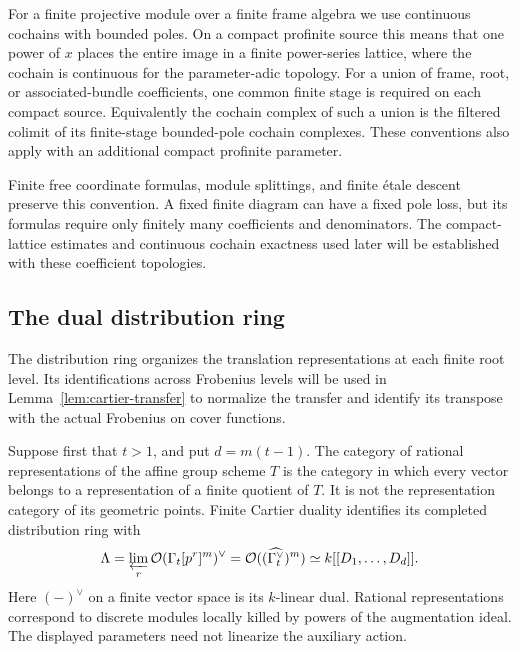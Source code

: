 \begin{definition}
\label{rings:bounded-cochains}
For a finite projective module over a finite frame algebra
we use continuous cochains with bounded poles.  On a compact
profinite source this means that one power of $x$ places the
entire image in a finite power-series lattice, where the
cochain is continuous for the parameter-adic topology.
For a union of frame, root, or associated-bundle coefficients,
one common finite stage is required on each compact source.
Equivalently the cochain complex of such a union is the
filtered colimit of its finite-stage bounded-pole cochain
complexes.  These conventions also apply with an additional
compact profinite parameter.
\end{definition}

Finite free coordinate formulas, module splittings, and
finite \'etale descent preserve this convention.  A fixed
finite diagram can have a fixed pole loss, but its formulas
require only finitely many coefficients and denominators.
The compact-lattice estimates and continuous cochain
exactness used later will be established with these
coefficient topologies.

\subsection{The dual distribution ring}

The distribution ring organizes the translation representations at each
finite root level. Its identifications across Frobenius levels will be used in
Lemma~\ref{lem:cartier-transfer} to normalize the transfer and identify its
transpose with the actual Frobenius on cover functions.

Suppose first that $t>1$, and put $d=m(t-1)$.
The category of rational representations of the affine
group scheme $T$ is the category in which every vector
belongs to a representation of a finite quotient of $T$.
It is not the representation category of its geometric
points.  Finite Cartier duality identifies its completed
distribution ring with
\begin{equation}\label{rings:distribution-ring}
 \Lambda=\varprojlim_r\mathcal O(\Gamma_t[p^r]^m)^\vee
     =\mathcal O((\widehat{\Gamma_t^\vee})^m)
     \simeq k[[D_1,\ldots,D_d]].
\end{equation}
Here $(-)^\vee$ on a finite vector space is its $k$-linear
dual.  Rational representations correspond to discrete
modules locally killed by powers of the augmentation ideal.
The displayed parameters need not linearize the auxiliary
action.

